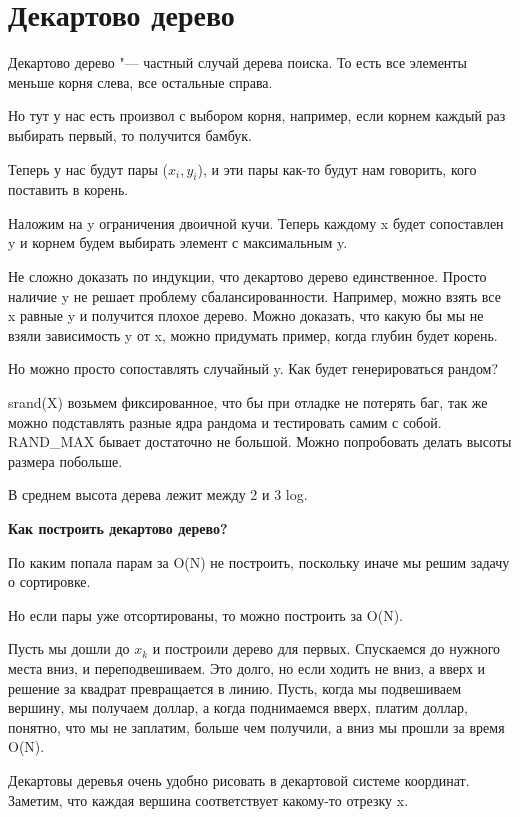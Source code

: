 \section{Декартово дерево}

\begin{Def}
Декартово дерево "--- частный случай дерева поиска.
То есть все элементы меньше корня слева, все остальные справа.
\end{Def}

Но тут у нас есть произвол с выбором корня, например, если корнем каждый раз выбирать первый, то
получится бамбук.

Теперь у нас будут пары ($x_i, y_i$), и эти пары как-то будут нам говорить, кого поставить в корень.

Наложим на y ограничения двоичной кучи. Теперь каждому x будет сопоставлен y и корнем будем выбирать
элемент с максимальным y.

Не сложно доказать по индукции, что декартово дерево единственное.  Просто наличие y не решает проблему сбалансированности.
Например, можно взять все x равные y и получится плохое дерево. Можно доказать, что какую бы мы не взяли зависимость y от x, можно
придумать пример, когда глубин будет корень.

Но можно просто сопоставлять случайный y. Как будет генерироваться рандом?

srand(X) возьмем фиксированное, что бы при отладке не потерять баг, так же можно
подставлять разные ядра рандома и тестировать самим с собой. RAND\_MAX бывает достаточно не большой. Можно попробовать
делать высоты размера побольше.

В среднем высота дерева лежит между 2 и 3 log.

\textbf{Как построить декартово дерево?}

По каким попала парам за O(N) не построить, поскольку иначе мы решим задачу о сортировке.

Но если пары уже отсортированы, то можно построить за O(N).

Пусть мы дошли до $x_k$ и построили дерево для первых. Спускаемся до нужного места вниз, и переподвешиваем. Это долго, 
но если ходить не вниз, а вверх и решение за квадрат превращается в линию. Пусть, когда мы подвешиваем вершину, мы получаем доллар, 
а когда поднимаемся вверх, платим доллар, понятно, что мы не заплатим, больше чем получили, а вниз мы прошли за время O(N). 

Декартовы деревья очень удобно рисовать в декартовой системе координат.
Заметим, что каждая вершина соответствует какому-то отрезку x.     

